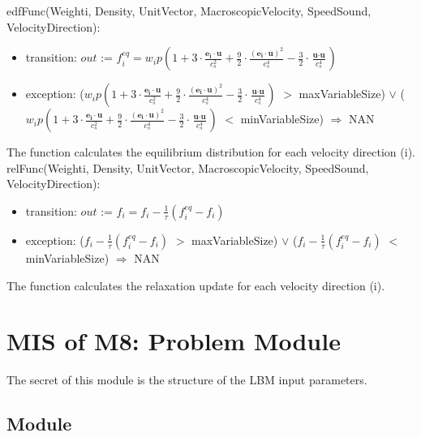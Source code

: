 \documentclass[12pt, titlepage]{article}
\begin{document}
\noindent edfFunc(Weighti, Density, UnitVector, MacroscopicVelocity, SpeedSound, VelocityDirection):
\begin{itemize}
	\item transition: $out$ := $f_{i}^{eq} = w_{i}p(1 + 3 \cdot \frac{\textbf{e}_\textbf{i}\cdot\textbf{u}}{c_s^2}+\frac{9}{2} \cdot \frac{(\textbf{e}_\textbf{i}\cdot\textbf{u})^2}{c_s^4}-\frac{3}{2} \cdot \frac{\textbf{u}\cdot\textbf{u}}{c_s^4})$
	\item exception: ($w_{i}p(1 + 3 \cdot \frac{\textbf{e}_\textbf{i}\cdot\textbf{u}}{c_s^2}+\frac{9}{2} \cdot \frac{(\textbf{e}_\textbf{i}\cdot\textbf{u})^2}{c_s^4}-\frac{3}{2} \cdot \frac{\textbf{u}\cdot\textbf{u}}{c_s^4})$ $>$ maxVariableSize) $\lor$ ($w_{i}p(1 + 3 \cdot \frac{\textbf{e}_\textbf{i}\cdot\textbf{u}}{c_s^2}+\frac{9}{2} \cdot \frac{(\textbf{e}_\textbf{i}\cdot\textbf{u})^2}{c_s^4}-\frac{3}{2} \cdot \frac{\textbf{u}\cdot\textbf{u}}{c_s^4})$ $<$ minVariableSize) $\Rightarrow$ NAN
\end{itemize}

The function calculates the equilibrium distribution for each velocity direction (i).\\

\noindent relFunc(Weighti, Density, UnitVector, MacroscopicVelocity, SpeedSound, VelocityDirection):
\begin{itemize}
	\item transition: $out$ := $f_{i} = f_{i} - \frac{1}{\tau}(f_{i}^{eq}-f_{i})$
	\item exception: ($f_{i} - \frac{1}{\tau}(f_{i}^{eq}-f_{i})$ $>$ maxVariableSize) $\lor$ ($f_{i} - \frac{1}{\tau}(f_{i}^{eq}-f_{i})$ $<$ minVariableSize) $\Rightarrow$ NAN
\end{itemize}

The function calculates the relaxation update for each velocity direction (i).\\

\newpage

\section{MIS of M8: Problem Module} \label{PRModule}

The secret of this module is the structure of the LBM input parameters.

\subsection{Module}
\end{document}
